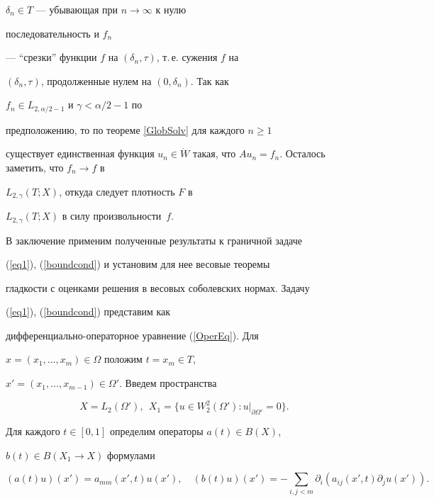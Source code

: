 \begin{pf}
$\delta_n \in T$ --- убывающая при $n \to \infty$ к нулю


последовательность и $f_n$


--- ``срезки'' функции $f$ на $(\delta_n,\tau)$, т.\,е. сужения $f$ на


$(\delta_n,\tau)$, продолженные нулем на $(0,\delta_n)$. Так как


$f_n \in L_{2,\alpha/2-1}$ и $\gamma < \alpha/2-1$ по


предположению, то по теореме \ref{GlobSolv} для каждого $n \ge 1$


существует единственная функция $u_n \in \Dot{W}$ такая, что $A


u_n= f_n$. Осталось заметить, что $f_n \to f$ в


$L_{2,\gamma}(T;X)$, откуда следует плотность $F$ в


$L_{2,\gamma}(T;X)$ в силу произвольности~$f$.


\end{pf}








В заключение применим полученные результаты к граничной задаче


(\ref{eq1}), (\ref{boundcond}) и установим для нее весовые теоремы


гладкости с оценками решения в весовых соболевских нормах. Задачу


(\ref{eq1}), (\ref{boundcond}) представим как


дифференциально-операторное уравнение (\ref{OperEq}). Для


$x=(x_1,\dotsc,x_m) \in \Omega$ положим $t=x_m \in T$,


$x'=(x_1,\dotsc,x_{m-1}) \in \Omega'$. Введем пространства


$$


X=L_2(\Omega'), \ \ X_1=\{u \in W^2_2(\Omega'): u|_{\partial


\Omega'}=0\}.


$$


Для каждого $t \in [0,1]$ определим операторы $a(t) \in B(X)$,


$b(t) \in B(X_1 \to X)$ формулами


$$


(a(t) u)(x') = a_{mm}(x',t)u(x'), \quad (b(t)


u)(x')=-\sum_{i,j < m}\partial_i(a_{ij}(x',t) \partial_j u(x')).


$$


